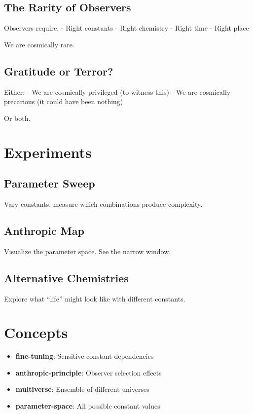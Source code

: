 \documentclass[
  11pt,
  letterpaper,
  twoside,
  openright]{book}
\providecommand{\tightlist}{%
  \setlength{\itemsep}{0pt}\setlength{\parskip}{0pt}}
\begin{document}
\subsection{The Rarity of Observers}\label{the-rarity-of-observers}

Observers require: - Right constants - Right chemistry - Right time -
Right place

We are cosmically rare.

\subsection{Gratitude or Terror?}\label{gratitude-or-terror}

Either: - We are cosmically privileged (to witness this) - We are
cosmically precarious (it could have been nothing)

Or both.

\section{Experiments}\label{experiments-40}

\subsection{Parameter Sweep}\label{parameter-sweep}

Vary constants, measure which combinations produce complexity.

\subsection{Anthropic Map}\label{anthropic-map}

Visualize the parameter space. See the narrow window.

\subsection{Alternative Chemistries}\label{alternative-chemistries}

Explore what ``life'' might look like with different constants.

\section{Concepts}\label{concepts-41}

\begin{itemize}
\tightlist
\item
  \textbf{fine-tuning}: Sensitive constant dependencies
\item
  \textbf{anthropic-principle}: Observer selection effects
\item
  \textbf{multiverse}: Ensemble of different universes
\item
  \textbf{parameter-space}: All possible constant values
\end{itemize}
\end{document}
